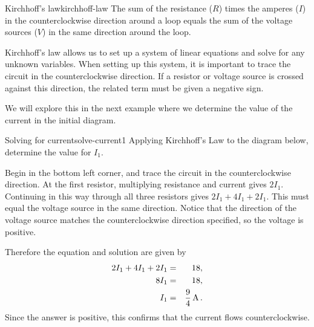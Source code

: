 \begin{theorem}{Kirchhoff's law}{kirchhoff-law}
  The sum of the resistance ($R$) times the amperes ($I$) in the
  counterclockwise direction around a loop equals the sum of the
  voltage sources ($V$) in the same direction around the loop.
\end{theorem}

Kirchhoff's law allows us to set up a system of linear equations and
solve for any unknown variables. When setting up this system, it is
important to trace the circuit in the counterclockwise direction. If a
resistor or voltage source is crossed against this direction, the
related term must be given a negative sign.

We will explore this in the next example where we determine the value
of the current in the initial diagram.

\begin{example}{Solving for current}{solve-current1}
  Applying Kirchhoff's Law to the diagram below, determine the value for $I_1$.

  \begin{center}
  \end{center}

\end{example}

\begin{solution}
  Begin in the bottom left corner, and trace the circuit in the
  counterclockwise direction. At the first resistor, multiplying
  resistance and current gives $2I_1$. Continuing in this way through
  all three resistors gives $2I_1 + 4I_1 + 2 I_1$. This must equal the
  voltage source in the same direction. Notice that the direction of
  the voltage source matches the counterclockwise direction specified,
  so the voltage is positive.

  Therefore the equation and solution are given by
  \begin{eqnarray*}
    2I_1 + 4I_1 + 2 I_1 &=& 18, \\
    8I_1 &=& 18, \\
    I_1 &=& \frac{9}{4} \mathop{\textrm{\rm A}}\nolimits.
  \end{eqnarray*}
  Since the answer is positive, this confirms that the current flows
  counterclockwise.
\end{solution}


